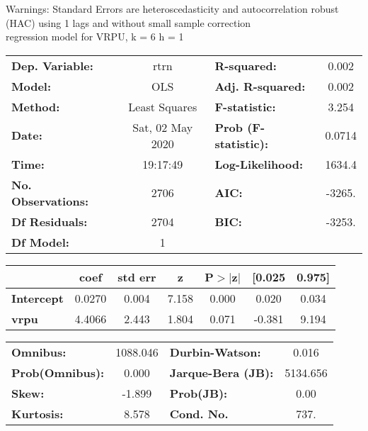 Warnings: \newline
 [1] Standard Errors are heteroscedasticity and autocorrelation robust (HAC) using 1 lags and without small sample correction\\ 

regression model for VRPU, k = 6 h = 1\begin{center}
\begin{tabular}{lclc}
\toprule
\textbf{Dep. Variable:}    &       rtrn       & \textbf{  R-squared:         } &     0.002   \\
\textbf{Model:}            &       OLS        & \textbf{  Adj. R-squared:    } &     0.002   \\
\textbf{Method:}           &  Least Squares   & \textbf{  F-statistic:       } &     3.254   \\
\textbf{Date:}             & Sat, 02 May 2020 & \textbf{  Prob (F-statistic):} &   0.0714    \\
\textbf{Time:}             &     19:17:49     & \textbf{  Log-Likelihood:    } &    1634.4   \\
\textbf{No. Observations:} &        2706      & \textbf{  AIC:               } &    -3265.   \\
\textbf{Df Residuals:}     &        2704      & \textbf{  BIC:               } &    -3253.   \\
\textbf{Df Model:}         &           1      & \textbf{                     } &             \\
\bottomrule
\end{tabular}
\begin{tabular}{lcccccc}
                   & \textbf{coef} & \textbf{std err} & \textbf{z} & \textbf{P$> |$z$|$} & \textbf{[0.025} & \textbf{0.975]}  \\
\midrule
\textbf{Intercept} &       0.0270  &        0.004     &     7.158  &         0.000        &        0.020    &        0.034     \\
\textbf{vrpu}      &       4.4066  &        2.443     &     1.804  &         0.071        &       -0.381    &        9.194     \\
\bottomrule
\end{tabular}
\begin{tabular}{lclc}
\textbf{Omnibus:}       & 1088.046 & \textbf{  Durbin-Watson:     } &    0.016  \\
\textbf{Prob(Omnibus):} &   0.000  & \textbf{  Jarque-Bera (JB):  } & 5134.656  \\
\textbf{Skew:}          &  -1.899  & \textbf{  Prob(JB):          } &     0.00  \\
\textbf{Kurtosis:}      &   8.578  & \textbf{  Cond. No.          } &     737.  \\
\bottomrule
\end{tabular}
\end{center}

